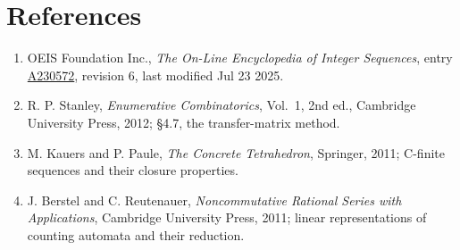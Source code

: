 \documentclass[11pt]{article}
\theoremstyle{definition}
\begin{document}
\section{References}

\begin{enumerate}

\item OEIS Foundation Inc., \emph{The On-Line Encyclopedia of Integer Sequences}, entry \href{https://oeis.org/A230572}{A230572}, revision 6, last modified Jul 23 2025.

\item R. P. Stanley, \emph{Enumerative Combinatorics}, Vol.~1, 2nd ed., Cambridge University Press, 2012; \S4.7, the transfer-matrix method.

\item M. Kauers and P. Paule, \emph{The Concrete Tetrahedron}, Springer, 2011; C-finite sequences and their closure properties.

\item J. Berstel and C. Reutenauer, \emph{Noncommutative Rational Series with Applications}, Cambridge University Press, 2011; linear representations of counting automata and their reduction.

\end{enumerate}
\end{document}

